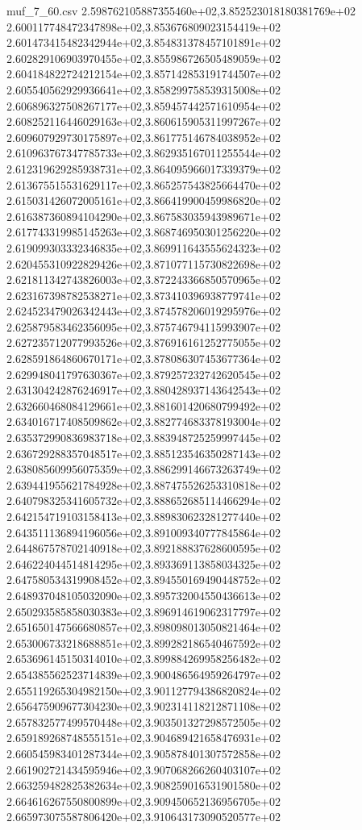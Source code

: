 \begin{filecontents*}{muf_7_60.csv}
2.598762105887355460e+02,3.852523018180381769e+02
2.600117748472347898e+02,3.853676809023154419e+02
2.601473415482342944e+02,3.854831378457101891e+02
2.602829106903970455e+02,3.855986726505489059e+02
2.604184822724212154e+02,3.857142853191744507e+02
2.605540562929936641e+02,3.858299758539315008e+02
2.606896327508267177e+02,3.859457442571610954e+02
2.608252116446029163e+02,3.860615905311997267e+02
2.609607929730175897e+02,3.861775146784038952e+02
2.610963767347785733e+02,3.862935167011255544e+02
2.612319629285938731e+02,3.864095966017339379e+02
2.613675515531629117e+02,3.865257543825664470e+02
2.615031426072005161e+02,3.866419900459986820e+02
2.616387360894104290e+02,3.867583035943989671e+02
2.617743319985145263e+02,3.868746950301256220e+02
2.619099303332346835e+02,3.869911643555624323e+02
2.620455310922829426e+02,3.871077115730822698e+02
2.621811342743826003e+02,3.872243366850570965e+02
2.623167398782538271e+02,3.873410396938779741e+02
2.624523479026342443e+02,3.874578206019295976e+02
2.625879583462356095e+02,3.875746794115993907e+02
2.627235712077993526e+02,3.876916161252775055e+02
2.628591864860670171e+02,3.878086307453677364e+02
2.629948041797630367e+02,3.879257232742620545e+02
2.631304242876246917e+02,3.880428937143642543e+02
2.632660468084129661e+02,3.881601420680799492e+02
2.634016717408509862e+02,3.882774683378193004e+02
2.635372990836983718e+02,3.883948725259997445e+02
2.636729288357048517e+02,3.885123546350287143e+02
2.638085609956075359e+02,3.886299146673263749e+02
2.639441955621784928e+02,3.887475526253310818e+02
2.640798325341605732e+02,3.888652685114466294e+02
2.642154719103158413e+02,3.889830623281277440e+02
2.643511136894196056e+02,3.891009340777845864e+02
2.644867578702140918e+02,3.892188837628600595e+02
2.646224044514814295e+02,3.893369113858034325e+02
2.647580534319908452e+02,3.894550169490448752e+02
2.648937048105032090e+02,3.895732004550436613e+02
2.650293585858030383e+02,3.896914619062317797e+02
2.651650147566680857e+02,3.898098013050821464e+02
2.653006733218688851e+02,3.899282186540467592e+02
2.653696145150314010e+02,3.899884269958256482e+02
2.654385562523714839e+02,3.900486564959264797e+02
2.655119265304982150e+02,3.901127794386820824e+02
2.656475909677304230e+02,3.902314118212871108e+02
2.657832577499570448e+02,3.903501327298572505e+02
2.659189268748555151e+02,3.904689421658476931e+02
2.660545983401287344e+02,3.905878401307572858e+02
2.661902721434595946e+02,3.907068266260403107e+02
2.663259482825382634e+02,3.908259016531901580e+02
2.664616267550800899e+02,3.909450652136956705e+02
2.665973075587806420e+02,3.910643173090520577e+02

\end{filecontents*}
